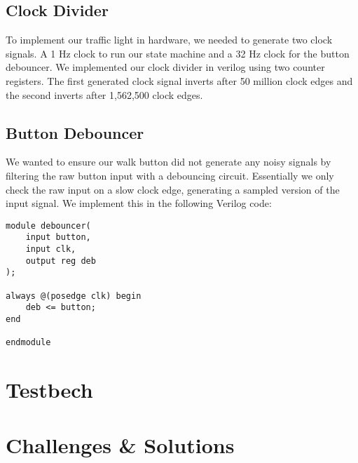 \documentclass[11pt]{article}
\begin{document}
\subsection{Clock Divider}
To implement our traffic light in hardware, we needed to generate two clock signals. A 1 Hz clock to run our state machine and a 32 Hz clock for the button debouncer. We implemented our clock divider in verilog using two counter registers. The first generated clock signal inverts after 50 million clock edges and the second inverts after 1,562,500 clock edges. 

\subsection{Button Debouncer}
We wanted to ensure our walk button did not generate any noisy signals by filtering the raw button input with a debouncing circuit. Essentially we only check the raw input on a slow clock edge, generating a sampled version of the input signal. We implement this in the following Verilog code:

\begin{lstlisting}
module debouncer(
	input button,
	input clk,
	output reg deb
);

always @(posedge clk) begin
	deb <= button;
end

endmodule
\end{lstlisting}

\section{Testbech}

\section{Challenges \& Solutions}
\end{document}
